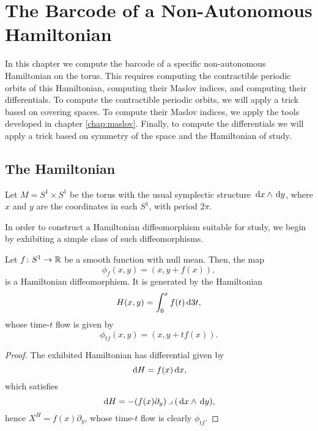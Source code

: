 \chapter{The Barcode of a Non-Autonomous Hamiltonian}

In this chapter we compute the barcode of a specific non-autonomous Hamiltonian on the torus. This requires computing the contractible periodic orbits of this Hamiltonian, computing their Maslov indices, and computing their differentials. To compute the contractible periodic orbits, we will apply a trick based on covering spaces. To compute their Maslov indices, we apply the tools developed in chapter \ref{chap:maslov}. Finally, to compute the differentials we will apply a trick based on symmetry of the space and the Hamiltonian of study.

\section{The Hamiltonian}

Let $M = S^1 \times S^1$ be the torus with the usual symplectic structure $\dl x \wedge \dl y$, where $x$ and $y$ are the coordinates in each $S^1$, with period $2\pi$.

In order to construct a Hamiltonian diffeomorphism suitable for study, we begin by exhibiting a simple class of such diffeomorphisms.

\begin{lemma}
Let $f \colon S^1 \to \mathbb{R}$ be a smooth function with null mean. Then, the map
\begin{equation}
\phi_f(x,y) = (x, y + f(x)),
\end{equation}
is a Hamiltonian diffeomorphism. It is generated by the Hamiltonian
\begin{equation}
H(x,y) = \int_0^x f(t) \dl3 t,
\end{equation}
whose time-$t$ flow is given by
\begin{equation}
\phi_{tf}(x,y) = (x, y + t f(x)).
\end{equation}
\end{lemma}

\begin{proof}
The exhibited Hamiltonian has differential given by
\begin{equation}
\dl H = f(x) \dl x,
\end{equation}
which satisfies
\begin{equation}
\dl H = - (f(x) \partial_y) \into (\dl x \wedge \dl y),
\end{equation}
hence $X^H = f(x) \partial_y$, whose time-$t$ flow is clearly $\phi_{tf}$.
\end{proof}

